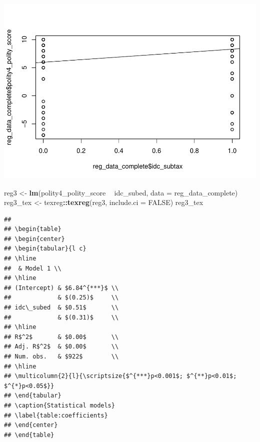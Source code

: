 \documentclass[
]{article}
\newenvironment{Shaded}{\begin{snugshade}}{\end{snugshade}}
\newcommand{\DataTypeTok}[1]{\textcolor[rgb]{0.13,0.29,0.53}{#1}}
\newcommand{\KeywordTok}[1]{\textcolor[rgb]{0.13,0.29,0.53}{\textbf{#1}}}
\newcommand{\NormalTok}[1]{#1}
\newcommand{\OperatorTok}[1]{\textcolor[rgb]{0.81,0.36,0.00}{\textbf{#1}}}
\newcommand{\OtherTok}[1]{\textcolor[rgb]{0.56,0.35,0.01}{#1}}
\newcommand{\StringTok}[1]{\textcolor[rgb]{0.31,0.60,0.02}{#1}}
\begin{document}
\includegraphics{05_tjbrailey_summary_statistics_files/figure-latex/unnamed-chunk-4-2.pdf}

\begin{Shaded}
\begin{Highlighting}[]
\NormalTok{reg3 <-}\StringTok{ }\KeywordTok{lm}\NormalTok{(polity4_polity_score }\OperatorTok{~}\StringTok{ }\NormalTok{idc_subed, }\DataTypeTok{data =}\NormalTok{ reg_data_complete)}
\NormalTok{reg3_tex <-}\StringTok{ }\NormalTok{texreg}\OperatorTok{::}\KeywordTok{texreg}\NormalTok{(reg3, }\DataTypeTok{include.ci =} \OtherTok{FALSE}\NormalTok{)}
\NormalTok{reg3_tex}
\end{Highlighting}
\end{Shaded}

\begin{verbatim}
## 
## \begin{table}
## \begin{center}
## \begin{tabular}{l c}
## \hline
##  & Model 1 \\
## \hline
## (Intercept) & $6.84^{***}$ \\
##             & $(0.25)$     \\
## idc\_subed  & $0.51$       \\
##             & $(0.31)$     \\
## \hline
## R$^2$       & $0.00$       \\
## Adj. R$^2$  & $0.00$       \\
## Num. obs.   & $922$        \\
## \hline
## \multicolumn{2}{l}{\scriptsize{$^{***}p<0.001$; $^{**}p<0.01$; $^{*}p<0.05$}}
## \end{tabular}
## \caption{Statistical models}
## \label{table:coefficients}
## \end{center}
## \end{table}
\end{verbatim}
\end{document}
